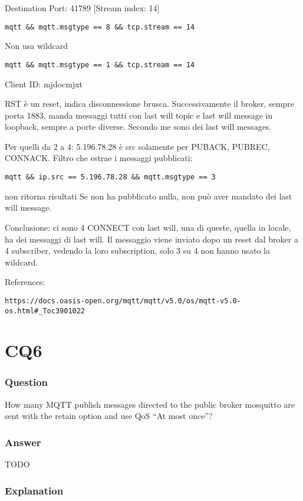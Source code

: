 Destination Port: 41789
[Stream index: 14]
\begin{verbatim}
mqtt && mqtt.msgtype == 8 && tcp.stream == 14
\end{verbatim}
Non usa wildcard
\begin{verbatim}
mqtt && mqtt.msgtype == 1 && tcp.stream == 14
\end{verbatim}
Client ID: mjdocmjxt

RST è un reset, indica disconnessione brusca.
Successivamente il broker, sempre porta 1883, manda messaggi tutti con last will topic e last will message in loopback, sempre a porte diverse.
Secondo me sono dei last will messages.

Per quelli da 2 a 4:
5.196.78.28 è src solamente per PUBACK, PUBREC, CONNACK.
Filtro che estrae i messaggi pubblicati:
\begin{verbatim}
mqtt && ip.src == 5.196.78.28 && mqtt.msgtype == 3 
\end{verbatim}
non ritorna risultati
Se non ha pubblicato nulla, non può aver mandato dei last will message.

Conclusione: ci sono 4 CONNECT con last will, una di queste, quella in locale, ha dei messaggi di last will. 
Il messaggio viene inviato dopo un reset dal broker a 4 subscriber, vedendo la loro subscription, solo 3 su 4 non hanno usato la wildcard.

References:
\begin{verbatim}
https://docs.oasis-open.org/mqtt/mqtt/v5.0/os/mqtt-v5.0-os.html#_Toc3901022
\end{verbatim}

\section{CQ6}
\subsubsection{Question}
How many MQTT publish messages directed to the public broker mosquitto are sent with the retain option and use QoS “At most once”?

\subsubsection{Answer}
TODO 

\subsubsection{Explanation}

